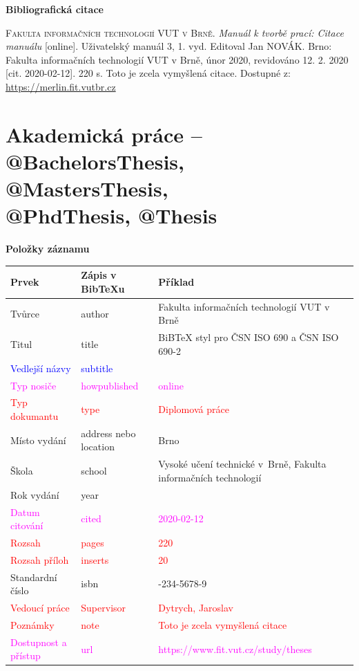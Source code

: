 \bigskip

\noindent \textbf{Bibliografická citace}

\medskip

\noindent \textsc{Fakulta informačních technologií VUT v Brně}. \textit{Manuál k tvorbě prací: Citace manuálu} [online]. Uživatelský manuál 3, 1. vyd. Editoval Jan NOVÁK.
Brno: Fakulta informačních technologií VUT v Brně, únor 2020, revidováno 12. 2. 2020 [cit. 2020-02-12]. 220 s. Toto je zcela vymyšlená citace. Dostupné z: \url{https://merlin.fit.vutbr.cz}
\newpage
\section*{Akademická práce -- @BachelorsThesis, @MastersThesis, \\@PhdThesis, @Thesis}
\label{pr-thesis}
\noindent \textbf{Položky záznamu}

\medskip

\begin{tabularx}{0.95\linewidth}{X X >{\raggedright\arraybackslash}X}
    Prvek & Zápis v BibTeXu & Příklad\\\hline
    Tvůrce & author & Fakulta informačních technologií VUT v Brně\\
    Titul & title & BiBTeX styl pro ČSN ISO 690 a ČSN ISO 690-2\\
    \textcolor{blue}{Vedlejší názvy} & \textcolor{blue}{subtitle} & \\
    \textcolor{magenta}{Typ nosiče} & \textcolor{magenta}{howpublished} & \textcolor{magenta}{online}\\
    \textcolor{red}{Typ dokumantu} & \textcolor{red}{type} & \textcolor{red}{Diplomová práce}\\
    Místo vydání & address nebo location & Brno\\
    Škola & school & Vysoké učení technické v~Brně, Fakulta informačních technologií\\
    Rok vydání & year & 2020\\
    \textcolor{magenta}{Datum citování} & \textcolor{magenta}{cited} & \textcolor{magenta}{2020-02-12}\\
    \textcolor{red}{Rozsah} & \textcolor{red}{pages} & \textcolor{red}{220}\\
    \textcolor{red}{Rozsah příloh} & \textcolor{red}{inserts} & \textcolor{red}{20}\\
    Standardní číslo & isbn & 01-234-5678-9\\
    \textcolor{red}{Vedoucí práce} & \textcolor{red}{Supervisor} & \textcolor{red}{Dytrych, Jaroslav}\\
    \textcolor{red}{Poznámky} & \textcolor{red}{note} & \textcolor{red}{Toto je zcela vymyšlená citace}\\
    \textcolor{magenta}{Dostupnost a přístup} & \textcolor{magenta}{url} & \textcolor{magenta}{https://www.fit.vut.cz/\-study/theses}\\
\end{tabularx}

